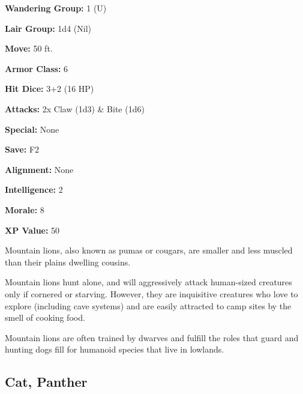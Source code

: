 \begin{multicols*}{2}
{{\textbf{Wandering Group:} 1 (U)

\textbf{Lair Group:} 1d4 (Nil)

\textbf{Move:} 50 ft.

\textbf{Armor Class:} 6

\textbf{Hit Dice:} 3+2 (16 HP)

\textbf{Attacks:} 2x Claw (1d3) \& Bite (1d6)

\textbf{Special:} None

\textbf{Save:} F2

\textbf{Alignment:} None

\textbf{Intelligence:} 2

\textbf{Morale:} 8

\textbf{XP Value:} 50}}

Mountain lions, also known as pumas or cougars, are smaller and less muscled than their plains dwelling cousins.

Mountain lions hunt alone, and will aggressively attack human-sized creatures only if cornered or starving. However, they are inquisitive creatures who love to explore (including cave systems) and are easily attracted to camp sites by the smell of cooking food.

Mountain lions are often trained by dwarves and fulfill the roles that guard and hunting dogs fill for humanoid species that live in lowlands.

\subsection{Cat, Panther}
\end{multicols*}
